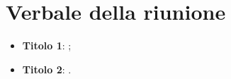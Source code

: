 \section{Verbale della riunione}
	\begin{itemize}
		\item \textbf{Titolo 1}: ;
		\item \textbf{Titolo 2}: .
	\end{itemize}
